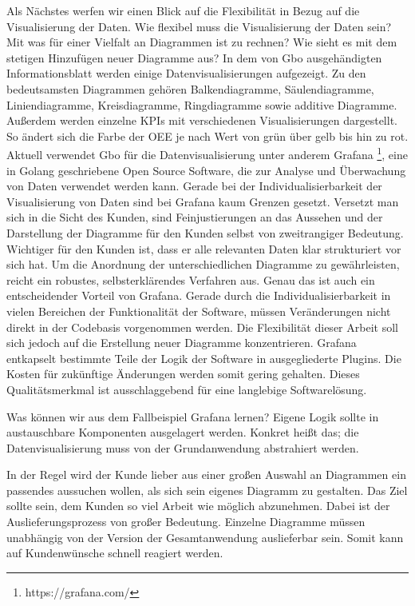 Als Nächstes werfen wir einen Blick auf die Flexibilität in Bezug auf die Visualisierung der Daten. Wie flexibel
muss die Visualisierung der Daten sein? Mit was für einer Vielfalt an Diagrammen ist zu rechnen? Wie sieht es
mit dem stetigen Hinzufügen neuer Diagramme aus? In dem von Gbo ausgehändigten Informationsblatt
werden einige Datenvisualisierungen aufgezeigt. Zu den bedeutsamsten Diagrammen gehören Balkendiagramme,
Säulendiagramme, Liniendiagramme, Kreisdiagramme, Ringdiagramme sowie additive Diagramme. Außerdem werden
einzelne KPIs mit verschiedenen Visualisierungen dargestellt. So ändert sich die Farbe der OEE je nach
Wert von grün über gelb bis hin zu rot. Aktuell verwendet Gbo für die Datenvisualisierung unter
anderem Grafana \footnote{https://grafana.com/}, eine in Golang geschriebene Open Source Software, die zur Analyse
und Überwachung von Daten verwendet werden kann. Gerade bei der Individualisierbarkeit der Visualisierung
von Daten sind bei Grafana kaum Grenzen gesetzt. Versetzt man sich in die Sicht des Kunden, sind \mbox{Feinjustierungen}
an das Aussehen und der Darstellung der Diagramme für den Kunden selbst von zweitrangiger Bedeutung.
Wichtiger für den Kunden ist, dass er alle relevanten Daten klar strukturiert vor sich hat. Um die Anordnung
der unterschiedlichen Diagramme zu gewährleisten, reicht ein robustes, selbsterklärendes Verfahren aus.
Genau das ist auch ein entscheidender Vorteil von Grafana. Gerade durch die
Individualisierbarkeit in vielen Bereichen der Funktionalität der Software, müssen Veränderungen nicht
direkt in der Codebasis vorgenommen werden. Die Flexibilität dieser Arbeit soll sich jedoch auf die
Erstellung neuer Diagramme konzentrieren. Grafana entkapselt bestimmte Teile der Logik der Software
in ausgegliederte Plugins.\cite{GrafanaDeveloperGuide} Die Kosten für zukünftige Änderungen werden
somit gering gehalten. Dieses Qualitätsmerkmal ist ausschlaggebend für eine langlebige Softwarelösung.

Was können wir aus dem Fallbeispiel Grafana lernen? Eigene Logik sollte in austauschbare Komponenten
ausgelagert werden. Konkret heißt das; die Datenvisualisierung muss von der Grundanwendung abstrahiert
werden.

In der Regel wird der Kunde lieber aus einer großen Auswahl an Diagrammen ein passendes aussuchen wollen,
als sich sein eigenes Diagramm zu gestalten. Das Ziel sollte sein, dem Kunden so viel Arbeit wie möglich abzunehmen.
Dabei ist der Auslieferungsprozess von großer Bedeutung. Einzelne Diagramme müssen unabhängig von der Version der
Gesamtanwendung auslieferbar sein. Somit kann auf Kundenwünsche schnell reagiert werden.

